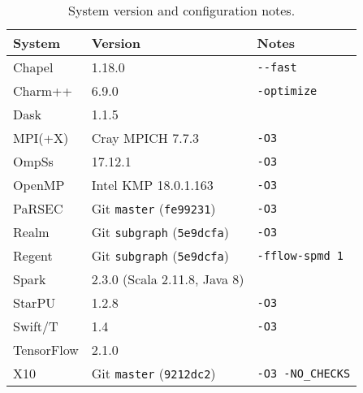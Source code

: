 \begin{table}[t]
\small
\begin{tabular}{@{} l | l | l @{}}
System & Version & Notes \\
\hline
Chapel & 1.18.0 & {\lstinline!--fast!} \\
Charm++ & 6.9.0 & {\lstinline!-optimize!} \\
Dask & 1.1.5 & \\
MPI(+X) & Cray MPICH 7.7.3 & {\lstinline!-O3!} \\
OmpSs & 17.12.1 & {\lstinline!-O3!} \\
OpenMP & Intel KMP 18.0.1.163 & {\lstinline!-O3!} \\
PaRSEC & Git {\lstinline!master!} (\lstinline!fe99231!) & {\lstinline!-O3!} \\
Realm & Git {\lstinline!subgraph!} (\lstinline!5e9dcfa!) & {\lstinline!-O3!} \\
Regent & Git {\lstinline!subgraph!} (\lstinline!5e9dcfa!) & {\lstinline!-fflow-spmd 1!} \\
Spark & 2.3.0 (Scala 2.11.8, Java 8) & \\
StarPU & 1.2.8 & {\lstinline!-O3!} \\
Swift/T & 1.4 & {\lstinline!-O3!} \\
TensorFlow & 2.1.0 & \\
X10 & Git {\lstinline!master!} (\lstinline!9212dc2!) & {\lstinline!-O3 -NO_CHECKS!}
\end{tabular}

\caption{System version and configuration notes.\label{tab:flags}}
\vspace{-0.5cm}
\end{table}

